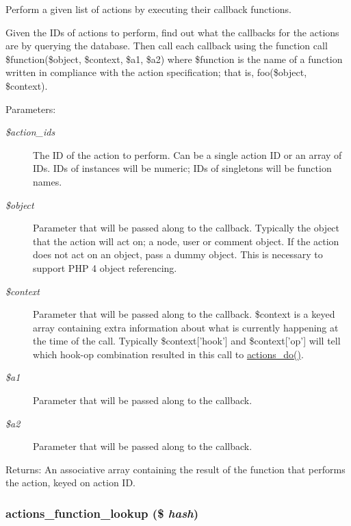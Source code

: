 Perform a given list of actions by executing their callback functions.

Given the IDs of actions to perform, find out what the callbacks for the actions are by querying the database. Then call each callback using the function call \$function(\$object, \$context, \$a1, \$a2) where \$function is the name of a function written in compliance with the action specification; that is, foo(\$object, \$context).

\begin{Desc}
\item[Parameters:]
\begin{description}
\item[{\em \$action\_\-ids}]The ID of the action to perform. Can be a single action ID or an array of IDs. IDs of instances will be numeric; IDs of singletons will be function names. \item[{\em \$object}]Parameter that will be passed along to the callback. Typically the object that the action will act on; a node, user or comment object. If the action does not act on an object, pass a dummy object. This is necessary to support PHP 4 object referencing. \item[{\em \$context}]Parameter that will be passed along to the callback. \$context is a keyed array containing extra information about what is currently happening at the time of the call. Typically \$context\mbox{[}'hook'\mbox{]} and \$context\mbox{[}'op'\mbox{]} will tell which hook-op combination resulted in this call to \hyperlink{actions_8inc_7da5f346de3d54e5b0cee717a6f2d390}{actions\_\-do()}. \item[{\em \$a1}]Parameter that will be passed along to the callback. \item[{\em \$a2}]Parameter that will be passed along to the callback.\end{description}
\end{Desc}
\begin{Desc}
\item[Returns:]An associative array containing the result of the function that performs the action, keyed on action ID. \end{Desc}
\hypertarget{actions_8inc_4a0e35c01b48d1a413889948c061a6f0}{
\subsubsection[{actions\_\-function\_\-lookup}]{\setlength{\rightskip}{0pt plus 5cm}actions\_\-function\_\-lookup (\$ {\em hash})}}
\label{actions_8inc_4a0e35c01b48d1a413889948c061a6f0}


